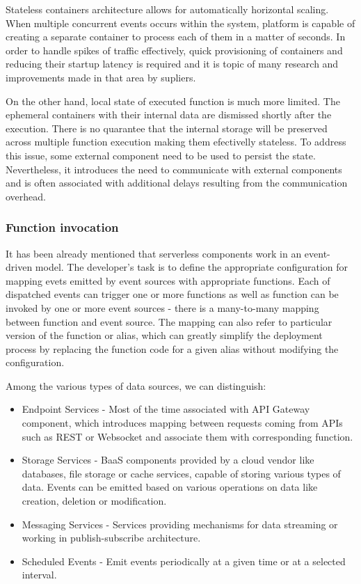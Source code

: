 Stateless containers architecture allows for automatically horizontal scaling. When multiple concurrent events occurs within the system, platform is capable of creating a separate container to process each of them in a matter of seconds. In order to handle spikes of traffic effectively, quick provisioning of containers and reducing their startup latency is required and it is topic of many research and improvements made in that area by supliers.

On the other hand, local state of executed function is much more limited. The ephemeral containers with their internal data are dismissed shortly after the execution. There is no quarantee that the internal storage will be preserved across multiple function execution making them efectivelly stateless. To address this issue, some external component need to be used to persist the state. Nevertheless, it introduces the need to communicate with external components and is often associated with additional delays resulting from the communication overhead.

\subsubsection*{Function invocation}

It has been already mentioned that serverless components work in an event-driven model. The developer's task is to define the appropriate configuration for mapping evets emitted by event sources with appropriate functions. Each of dispatched events can trigger one or more functions as well as function can be invoked by one or more event sources - there is a many-to-many mapping between function and event source. The mapping can also refer to particular version of the function or alias, which can greatly simplify the deployment process by replacing the function code for a given alias without modifying the configuration.

Among the various types of data sources, we can distinguish:

\begin{itemize}
    \item Endpoint Services - Most of the time associated with API Gateway component, which introduces mapping between requests coming from APIs such as REST or Websocket and associate them with corresponding function.
    \item Storage Services - BaaS components provided by a cloud vendor like databases, file storage or cache services, capable of storing various types of data. Events can be emitted based on various operations on data like creation, deletion or modification.
    \item Messaging Services - Services providing mechanisms for data streaming or working in publish-subscribe architecture.
    \item Scheduled Events - Emit events periodically at a given time or at a selected interval.
\end{itemize}

